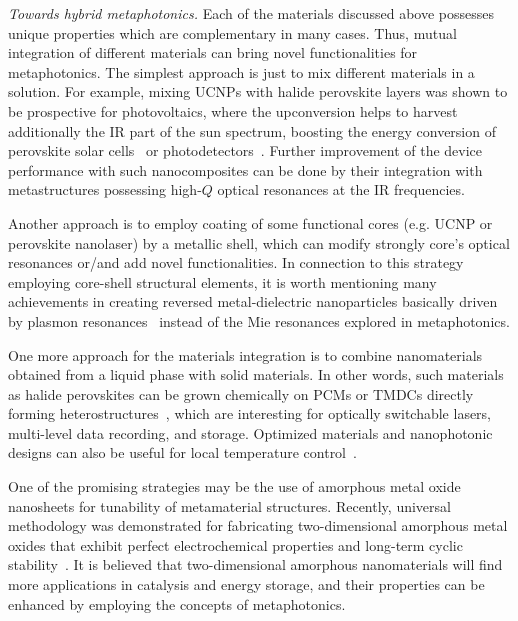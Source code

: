 \documentclass[journal=chreay,manuscript=review]{achemso}
\begin{document}
{\it Towards hybrid metaphotonics.} Each of the materials discussed above possesses unique properties which are complementary in many cases. Thus, mutual integration of different materials can bring novel functionalities for metaphotonics. The simplest approach is just to mix different materials in a solution. For example, mixing UCNPs with halide perovskite layers was shown to be prospective for photovoltaics, where the upconversion helps to harvest additionally the IR part of the sun spectrum, boosting the energy conversion of perovskite solar cells~\cite{he2016monodisperse} or photodetectors~\cite{zhang2017perovskite}. Further improvement of the device performance with such nanocomposites can be done by their integration with metastructures possessing high-$Q$ optical resonances at the IR frequencies. 

Another approach is to employ coating of some functional cores (e.g. UCNP or perovskite nanolaser) by a metallic shell, which can modify strongly  core's optical resonances or/and add novel functionalities. In connection to this strategy employing core-shell structural elements, it is worth mentioning many achievements in creating reversed metal-dielectric nanoparticles basically driven by plasmon resonances~\cite{volk,magnozzi} instead of the Mie resonances explored in metaphotonics. 

One more approach for the materials integration is to combine nanomaterials obtained from a liquid phase with solid materials. In other words, such materials as halide perovskites can be grown chemically on PCMs or TMDCs directly forming heterostructures~\cite{voznyy2017engineering}, which are interesting for optically switchable lasers, multi-level data recording, and storage. Optimized materials and nanophotonic designs can also be useful for local temperature control~\cite{zograf2021all}.

One of the promising strategies may be the use of amorphous metal oxide nanosheets for tunability of metamaterial structures. Recently, universal methodology was demonstrated for fabricating two-dimensional amorphous metal oxides  that exhibit perfect electrochemical properties and long-term cyclic stability~\cite{amo}.  It is believed that two-dimensional amorphous nanomaterials will find more applications in catalysis and energy storage, and their properties can be enhanced by employing the concepts of metaphotonics. 
\end{document}
